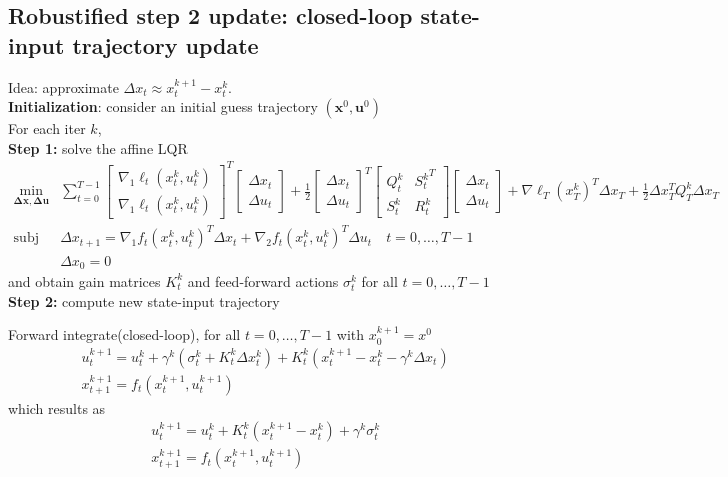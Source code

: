 \documentclass[openany]{book}
\theoremstyle{definition}
\theoremstyle{remark}
\begin{document}
\subsection{Robustified step 2 update: closed-loop state-input trajectory update}
Idea: approximate $\Delta x_t \approx x_t^{k+1}-x_t^k$.\\ 
\textbf{Initialization}: consider an initial guess trajectory $(\mathbf{x}^0,\mathbf{u}^0)$\\
For each iter $k$, \\
\textbf{Step 1:} solve the affine LQR
\begin{align*}
    \min_{\mathbf{\Delta x, \Delta u}}  &\displaystyle\sum_{t=0}^{T-1}\begin{bmatrix}
        \nabla_1\ell_t(x_t^k,u_t^k)\\
        \nabla_1\ell_t(x_t^k,u_t^k)
    \end{bmatrix}^T \begin{bmatrix}
        \Delta x_t \\ \Delta u_t
    \end{bmatrix} + \displaystyle\frac{1}{2}\begin{bmatrix}
        \Delta x_t \\ \Delta u_t
    \end{bmatrix}^T \begin{bmatrix}
        Q_t^k & {S_t^k}^T \\ S_t^k & R_t^k
    \end{bmatrix}\begin{bmatrix}
        \Delta x_t \\ \Delta u_t
    \end{bmatrix} 
     + \nabla\ell_T(x_T^k)^T\Delta x_T + \displaystyle\frac{1}{2}\Delta x_T^TQ_T^k\Delta x_T\\
    \text{subj to } & \Delta x_{t+1} = \nabla_1f_t(x_t^k,u_t^k)^T\Delta x_t + \nabla_2f_t(x_t^k,u_t^k)^T\Delta u_t \quad t=0,\dots,T-1 \\ 
    & \Delta x_0 = 0
\end{align*}
and obtain gain matrices $K_t^k$ and feed-forward actions $\sigma_t^k$ for all $t=0,\dots,T-1$\\ 
\textbf{Step 2:} compute new state-input trajectory 

Forward integrate(closed-loop), for all $t=0,\dots,T-1$ with $x_0^{k+1}=x^0$
\begin{align*}
    &u_t^{k+1} = u_t^k + \gamma^k(\sigma_t^k + K_t^k\Delta x_t^k) + K_t^k(x_t^{k+1}-x_t^k - \gamma^k\Delta x_t)\\ 
    & x_{t+1}^{k+1} = f_t(x_t^{k+1},u_t^{k+1})
\end{align*}
which results as 
\begin{align*}
    &u_t^{k+1} = u_t^k + K_t^k(x_t^{k+1}-x_t^k ) + \gamma^k\sigma_t^k  \\ 
    & x_{t+1}^{k+1} = f_t(x_t^{k+1},u_t^{k+1})
\end{align*}
\end{document}
